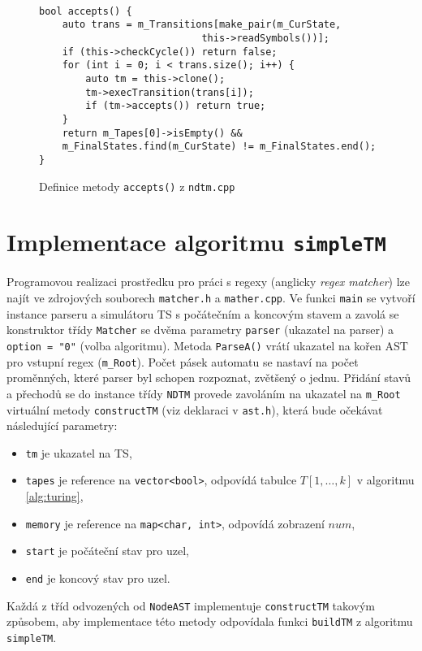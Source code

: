 \documentclass[thesis=B,czech]{FITthesis}[2019/12/23]
\theoremstyle{definition}
\begin{document}
\begin{figure}[ht]
	\begin{verbatim}

bool accepts() {
    auto trans = m_Transitions[make_pair(m_CurState, 
							this->readSymbols())];
    if (this->checkCycle()) return false;
    for (int i = 0; i < trans.size(); i++) {
        auto tm = this->clone();
        tm->execTransition(trans[i]);
        if (tm->accepts()) return true;
    }
    return m_Tapes[0]->isEmpty() && 
	m_FinalStates.find(m_CurState) != m_FinalStates.end();
}
	\end{verbatim}
	\caption{Definice metody \texttt{accepts()} z \texttt{ndtm.cpp}}\label{code:accepts}
\end{figure}


\section{Implementace algoritmu \texttt{simpleTM}}\label{sec:implTM}
Programovou realizaci prostředku pro práci s regexy (anglicky \emph{regex matcher}) lze najít ve zdrojových souborech \texttt{matcher.h} a \texttt{mather.cpp}. Ve funkci \texttt{main} se vytvoří instance parseru a simulátoru TS s počátečním a koncovým stavem a zavolá se konstruktor třídy \texttt{Matcher} se dvěma parametry \texttt{parser} (ukazatel na parser) a \texttt{option = "0"} (volba algoritmu). Metoda \texttt{ParseA()} vrátí ukazatel na kořen AST pro vstupní regex (\texttt{m\_Root}). Počet pásek automatu se nastaví na počet proměnných, které parser byl schopen rozpoznat, zvětšený o jednu. Přidání stavů a přechodů se do instance třídy \texttt{NDTM} provede zavoláním na ukazatel na \texttt{m\_Root} virtuální metody \texttt{constructTM} (viz deklaraci v \texttt{ast.h}), která bude očekávat následující parametry:
\begin{itemize}
	\item{\texttt{tm} je ukazatel na TS,}
	\item{\texttt{tapes} je reference na \texttt{vector<bool>}, odpovídá tabulce $T[1,\dots,k]$ v algoritmu \ref{alg:turing}, }
	\item{\texttt{memory} je reference na \texttt{map<char, int>}, odpovídá zobrazení $num$,}
	\item{\texttt{start} je počáteční stav pro uzel,}
	\item{\texttt{end} je koncový stav pro uzel.}
\end{itemize}
Každá z tříd odvozených od \texttt{NodeAST} implementuje \texttt{constructTM} takovým způsobem, aby implementace této metody odpovídala funkci \texttt{buildTM} z algoritmu \texttt{simpleTM}. 
\end{document}
